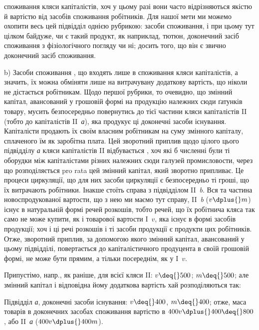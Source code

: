 \parcont{}  %
споживання кляси капіталістів, хоч у цьому разі вони часто відрізняються
якістю й вартістю від засобів споживання робітників. Для нашої мети
ми можемо охопити весь цей підвідділ однією рубрикою: 
засоби споживання, і при цьому тут цілком байдуже, чи є такий продукт,
як наприклад, тютюн, доконечний засіб споживання з фізіологічного
погляду чи ні; досить того, що він є звично доконечний засіб споживання.

b) Засоби споживання \deq{} , що входять лише в
споживання кляси капіталістів, а значить, їх можна обміняти лише на
витрачувану додаткову вартість, що ніколи не дістається робітникам.
Щодо першої рубрики, то очевидно, що змінний капітал, авансований у
грошовій формі на продукцію належних сюди ґатунків товару, мусить
безпосередньо повернутись до тієї частини кляси капіталістів II (тобто
до капіталістів II~\emph{а}), яка продукує ці доконечні засоби існування.
Капіталісти продають їх своїм власним робітникам на суму змінного капіталу,
сплаченого їм як заробітна плата. Цей зворотний приплив щодо цілого
цього підвідділу \emph{а} кляси капіталістів II відбувається ,
хоч які б численні були ті оборудки між капіталістами різних належних
сюди галузей промисловости, через що розподіляється pro rata
цей змінний капітал, який зворотно припливає. Це процеси циркуляції,
що для них засоби циркуляції є безпосередньо ті гроші, що їх витрачають
робітники. Інакше стоїть справа з підвідділом II~\emph{b}. Вся та частина
новоспродукованої вартости, що з нею ми маємо тут справу, II~\emph{b} ($v \dplus{} m$)
існує в натуральній формі речей розкошів, тобто речей, що їх робітнича
кляса так само не може купити, як і товарової вартости I~$v$, яка існує
в формі засобів продукції; хоч і ці речі розкошів і ті засоби продукції
є продукти цих робітників. Отже, зворотний приплив, за допомогою
якого змінний капітал, авансований у цьому підвідділі, повертається до
капіталістичного продуцента в своїй грошовій формі, не може бути
прямим, а тільки посереднім, як у I~$v$.

\label{original-310}
Припустімо, напр., як раніше, для всієї кляси II: $v \deq{} 500$; $m \deq{} 500$;
але змінний капітал і відповідна йому додаткова вартість хай розподіляються
так:

Підвідділ \emph{а}, доконечні засоби існування: $v \deq{} 400$, $m \deq{} 400$; отже,
маса товарів в доконечних засобах споживання вартістю в $400 v \dplus{} 400 \deq{} 800$,
або II~\emph{а} ($400 v \dplus{} 400 m$).

